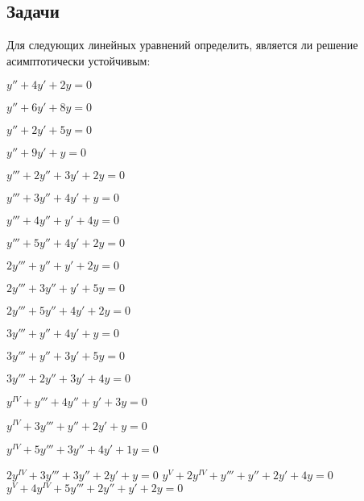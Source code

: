 \subsection{Задачи}

	Для следующих линейных уравнений определить, является ли решение асимптотически устойчивым:
	\begin{multicols}{2}
		\begin{enumtasks}
			
			\label{stability_hurwitz:simple_calc}
			\item \( y'' + 4y' + 2y = 0 \) %
			\item \( y'' + 6y' + 8y = 0 \) %
			\item \( y'' + 2y' + 5y = 0 \) %
			\item \( y'' + 9y' + y = 0 \) %
			\item \( y''' + 2y'' + 3y' + 2y = 0 \) %
			\item \( y''' + 3y'' + 4y' + y = 0 \) %
			\item \( y''' + 4y'' + y' + 4y = 0 \) %
			\item \( y''' + 5y'' + 4y' + 2y = 0 \) %
			\item \( 2y''' + y'' + y' + 2y = 0 \) %
			\item \( 2y''' + 3y'' + y' + 5y = 0 \) %

			\label{stability_hurwitz:simple_calc_part2}
			\item \( 2y''' + 5y'' + 4y' + 2y = 0 \) %
			\item \( 3y''' + y'' + 4y' + y = 0 \) %
			\item \( 3y''' + y'' + 3y' + 5y = 0 \) %
			\item \( 3y''' + 2y'' + 3y' + 4y = 0 \) %
			\item \( y^{IV} + y''' + 4y'' + y' + 3y = 0 \) %
			\item \( y^{IV} + 3y''' + y'' + 2y' + y = 0 \) %
			\item \( y^{IV} + 5y''' + 3y'' + 4y' + 1y = 0 \) %
			\item \( 2y^{IV} + 3y''' + 3y'' + 2y' + y = 0 \) %
			\itemstar \( y^{V} + 2y^{IV} + y''' + y'' + 2y' + 4y = 0 \) %
			\itemstar \( y^{V} + 4y^{IV} + 5y''' + 2y'' + y' + 2y = 0 \) %

		\end{enumtasks}
	\end{multicols}

